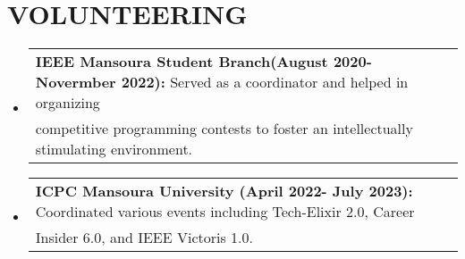 \documentclass[letterpaper,11pt]{article}
\makeatletter
\newcommand{\resumeProjectHeading}[2]{
    \item
    \begin{tabular*}{\textwidth}{l@{\extracolsep{\fill}}r}
      \small#1 & #2 \\
    \end{tabular*}\vspace{-7pt}
}
\newcommand{\resumeSubHeadingListStart}{\begin{itemize}[leftmargin=0in, label={}]}
\newcommand{\resumeSubHeadingListEnd}{\end{itemize}}
\makeatother
\begin{document}
%
\section{VOLUNTEERING}
    \resumeSubHeadingListStart
      \resumeProjectHeading
        {\textbf{IEEE Mansoura Student Branch(August 2020- Novermber 2022):} Served as a coordinator and helped in organizing \\competitive programming contests to foster an intellectually stimulating environment.}{}
      \resumeProjectHeading
        {\textbf{ICPC Mansoura University (April 2022- July 2023):} Coordinated various events including Tech-Elixir 2.0, Career \\Insider 6.0, and IEEE Victoris 1.0.}{}
    \resumeSubHeadingListEnd
\end{document}
